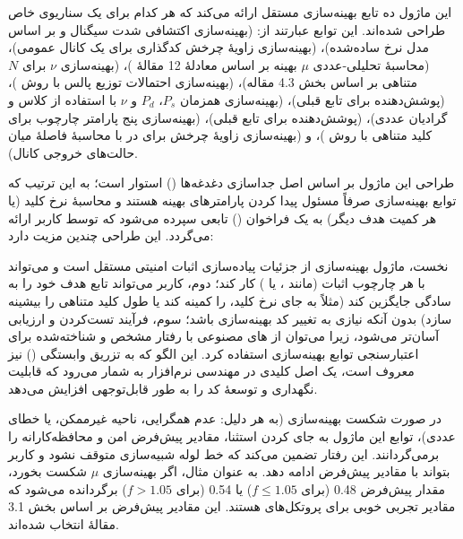 این ماژول ده تابع بهینه‌سازی مستقل ارائه می‌کند که هر کدام برای یک سناریوی خاص طراحی شده‌اند. این توابع عبارتند از:  (بهینه‌سازی اکتشافی شدت سیگنال و  بر اساس مدل نرخ ساده‌شده)،  (بهینه‌سازی زاویۀ چرخش کدگذاری برای یک کانال عمومی)،  (محاسبۀ تحلیلی-عددی $\mu$ بهینه بر اساس معادلۀ 12 مقالۀ )،  (بهینه‌سازی $\nu$ برای $N$ متناهی بر اساس بخش 4.3 مقاله)،  (بهینه‌سازی احتمالات توزیع پالس با روش )،  (پوشش‌دهنده برای تابع قبلی)،  (بهینه‌سازی همزمان $P_s$، $P_d$ و $\nu$ با استفاده از کلاس  و گرادیان عددی)،  (پوشش‌دهنده برای تابع قبلی)،  (بهینه‌سازی پنج پارامتر چارچوب  برای کلید متناهی با روش )، و  (بهینه‌سازی زاویۀ چرخش برای  در  با محاسبۀ فاصلۀ  میان حالت‌های خروجی کانال).

طراحی این ماژول بر اساس اصل جداسازی دغدغه‌ها () استوار است؛ به این ترتیب که توابع بهینه‌سازی صرفاً مسئول پیدا کردن پارامترهای بهینه هستند و محاسبۀ نرخ کلید (یا هر کمیت هدف دیگر) به یک فراخوان () تابعی سپرده می‌شود که توسط کاربر ارائه می‌گردد. این طراحی چندین مزیت دارد: 

نخست، ماژول بهینه‌سازی از جزئیات پیاده‌سازی اثبات امنیتی مستقل است و می‌تواند با هر چارچوب اثبات (مانند ،  یا ) کار کند؛ دوم، کاربر می‌تواند تابع هدف خود را به سادگی جایگزین کند (مثلاً به جای نرخ کلید،  را کمینه کند یا طول کلید متناهی را بیشینه سازد) بدون آنکه نیازی به تغییر کد بهینه‌سازی باشد؛ سوم، فرآیند تست‌کردن و ارزیابی آسان‌تر می‌شود، زیرا می‌توان از ‌های مصنوعی با رفتار مشخص و شناخته‌شده برای اعتبارسنجی توابع بهینه‌سازی استفاده کرد. این الگو که به تزریق وابستگی () نیز معروف است، یک اصل کلیدی در مهندسی نرم‌افزار به شمار می‌رود که قابلیت نگهداری و توسعهٔ کد را به طور قابل‌توجهی افزایش می‌دهد.


در صورت شکست بهینه‌سازی (به هر دلیل: عدم همگرایی، ناحیه غیرممکن، یا خطای عددی)، توابع این ماژول به جای  کردن استثنا، مقادیر پیش‌فرض امن و محافظه‌کارانه را برمی‌گردانند. این رفتار  تضمین می‌کند که خط لوله شبیه‌سازی متوقف نشود و کاربر بتواند با مقادیر پیش‌فرض ادامه دهد. به عنوان مثال، اگر بهینه‌سازی $\mu$ شکست بخورد، مقدار پیش‌فرض 0.48 (برای $f \le 1.05$) یا 0.54 (برای $f > 1.05$) برگردانده می‌شود که مقادیر تجربی خوبی برای پروتکل‌های  هستند. این مقادیر پیش‌فرض بر اساس بخش 3.1 مقالۀ  انتخاب شده‌اند.


